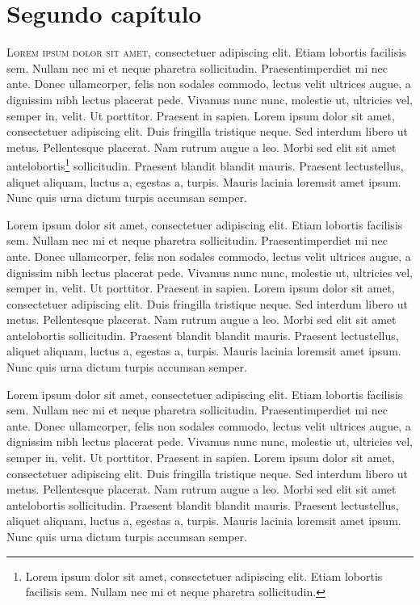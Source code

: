 \chapter{Segundo capítulo}

\lettrine{L}{orem ipsum dolor sit amet}, consectetuer adipiscing elit. Etiam lobortis facilisis sem. Nullam nec mi et neque pharetra sollicitudin. Praesentimperdiet mi nec ante. Donec ullamcorper, felis non sodales commodo, lectus velit ultrices augue, a dignissim nibh lectus placerat pede. Vivamus nunc nunc, molestie ut, ultricies vel, semper in, velit. Ut porttitor. Praesent in sapien. Lorem ipsum dolor sit amet, consectetuer adipiscing elit. Duis fringilla tristique neque. Sed interdum libero ut metus. Pellentesque placerat. Nam rutrum augue a leo. Morbi sed elit sit amet antelobortis\footnote{Lorem ipsum dolor sit amet, consectetuer adipiscing elit. Etiam lobortis facilisis sem. Nullam nec mi et neque pharetra sollicitudin.} sollicitudin. Praesent blandit blandit mauris. Praesent lectustellus, aliquet aliquam, luctus a, egestas a, turpis. Mauris lacinia loremsit amet ipsum. Nunc quis urna dictum turpis accumsan semper.

Lorem ipsum dolor sit amet, consectetuer adipiscing elit. Etiam lobortis facilisis sem. Nullam nec mi et neque pharetra sollicitudin. Praesentimperdiet mi nec ante. Donec ullamcorper, felis non sodales commodo, lectus velit ultrices augue, a dignissim nibh lectus placerat pede. Vivamus nunc nunc, molestie ut, ultricies vel, semper in, velit. Ut porttitor. Praesent in sapien. Lorem ipsum dolor sit amet, consectetuer adipiscing elit. Duis fringilla tristique neque. Sed interdum libero ut metus. Pellentesque placerat. Nam rutrum augue a leo. Morbi sed elit sit amet antelobortis sollicitudin. Praesent blandit blandit mauris. Praesent lectustellus, aliquet aliquam, luctus a, egestas a, turpis. Mauris lacinia loremsit amet ipsum. Nunc quis urna dictum turpis accumsan semper.

Lorem ipsum dolor sit amet, consectetuer adipiscing elit. Etiam lobortis facilisis sem. Nullam nec mi et neque pharetra sollicitudin. Praesentimperdiet mi nec ante. Donec ullamcorper, felis non sodales commodo, lectus velit ultrices augue, a dignissim nibh lectus placerat pede. Vivamus nunc nunc, molestie ut, ultricies vel, semper in, velit. Ut porttitor. Praesent in sapien. Lorem ipsum dolor sit amet, consectetuer adipiscing elit. Duis fringilla tristique neque. Sed interdum libero ut metus. Pellentesque placerat. Nam rutrum augue a leo. Morbi sed elit sit amet antelobortis sollicitudin. Praesent blandit blandit mauris. Praesent lectustellus, aliquet aliquam, luctus a, egestas a, turpis. Mauris lacinia loremsit amet ipsum. Nunc quis urna dictum turpis accumsan semper.